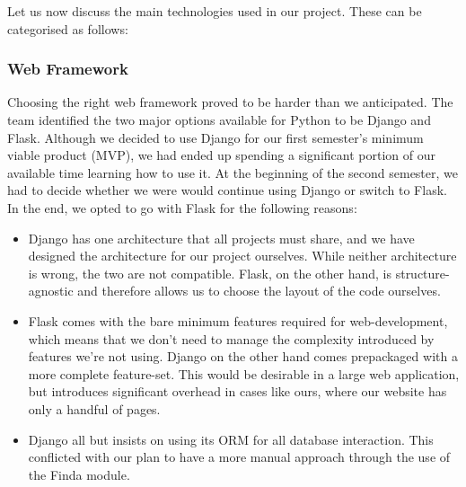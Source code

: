 \documentclass[main.tex]{subfiles}
\begin{document}
Let us now discuss the main technologies used in our project. These can be categorised as follows:


\subsubsection{Web Framework}
\label{Web Framework}
Choosing the right web framework proved to be harder than we anticipated. The team identified the two major options available for Python to be Django and Flask. Although we decided to use Django for our first semester's minimum viable product (MVP), we had ended up spending a significant portion of our available time learning how to use it. At the beginning of the second semester, we had to decide whether we were would continue using Django or switch to Flask. In the end, we opted to go with Flask for the following reasons:

\begin{itemize}
    \item Django has one architecture that all projects must share, and we have designed the architecture for our project ourselves. While neither architecture is wrong, the two are not compatible. Flask, on the other hand, is structure-agnostic and therefore allows us to choose the layout of the code ourselves.

    \item Flask comes with the bare minimum features required for web-development, which means that we don't need to manage the complexity introduced by features we're not using. Django on the other hand comes prepackaged with a more complete feature-set. This would be desirable in a large web application, but introduces significant overhead in cases like ours, where our website has only a handful of pages.

    \item Django all but insists on using its ORM for all database interaction. This conflicted with our plan to have a more manual approach through the use of the Finda module.
\end{itemize}
\end{document}
